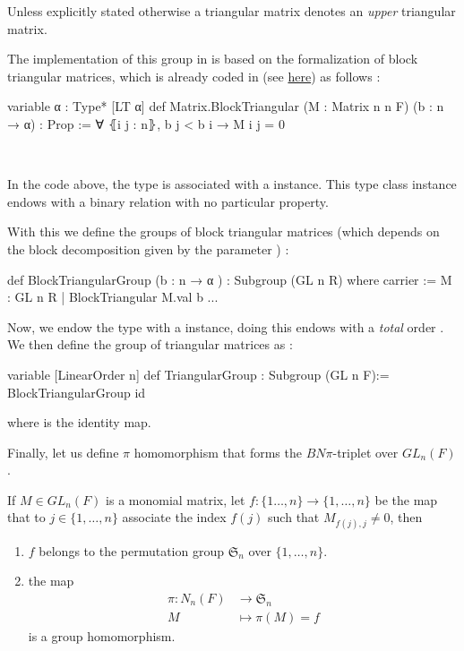 \begin{remarque}
Unless explicitly stated otherwise a triangular matrix denotes an \emph{upper} triangular matrix.
\end{remarque}

The implementation of this group in \Lean is based on the formalization of block triangular matrices, which is already coded in \Mathlib (see \href{https://leanprover-community.github.io/mathlib4_docs/Mathlib/LinearAlgebra/Matrix/Block.html#Matrix.BlockTriangular}{here}) as follows :
\begin{leancode}
variable {α : Type*} [LT α]
def Matrix.BlockTriangular (M : Matrix n n F) (b : n → α) : Prop :=
 ∀ ⦃i j : n⦄, b j < b i → M i j = 0
\end{leancode}

\begin{commentary}\

In the code above, the type  is associated with a \lean{[LT α]} instance. This type class instance endows  with a binary relation  with no particular property.
\end{commentary}

With this we define the groups of block triangular matrices (which depends on the block decomposition given by the parameter ) :

\begin{leancode}
def BlockTriangularGroup (b : n → α ) : Subgroup (GL n R) where
  carrier :=  {M : GL n R | BlockTriangular M.val b }
  ...
\end{leancode}

Now, we endow the type  with a \lean{[LinearOrder n]} instance, doing this endows  with a \emph{total} order . We then define the group of triangular matrices as : 
\begin{leancode}
variable [LinearOrder n] 
def  TriangularGroup : Subgroup (GL n F):= BlockTriangularGroup id
\end{leancode}
where  is the identity map. 

Finally, let us define $\pi$ homomorphism that forms the $BN\pi$-triplet over $GL_n(F)$.

If $M \in  GL_n\left( F \right)$ is a monomial matrix, let $f : \{1\ldots,n\} \to  \{1,\ldots,n\}$ be the map that to $j \in \{ 1,\ldots,n\}$ associate the index $f(j)$ such that $M_{f(j), j} \neq 0$, then

\begin{lemme}
    \begin{enumerate}
        \item $f$ belongs to the permutation group $\mathfrak{S}_n$ over $\{1,\ldots,n\}$.
        \item the map 
            \begin{align*}
                \pi : N_n\left( F \right) &\longrightarrow \mathfrak{S}_n \\
                M &\longmapsto \pi (M) = f  
            \end{align*} is a group homomorphism.
    \end{enumerate}
\end{lemme}

